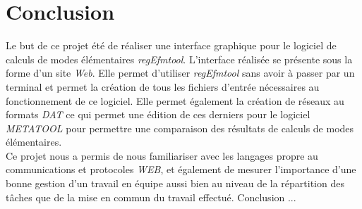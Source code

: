 \documentclass[12pt,a4paper]{report}
\begin{document}


\chapter*{Conclusion}
Le but de ce projet été de réaliser une interface graphique pour le logiciel de calculs de modes élémentaires \emph{regEfmtool}. L'interface réalisée se présente sous la forme d'un site \emph{Web}. Elle permet d'utiliser \emph{regEfmtool} sans avoir à passer par un terminal et permet la création de tous les fichiers d'entrée nécessaires au fonctionnement de ce logiciel.
Elle permet également la création de réseaux au formats \emph{DAT} ce qui permet une édition de ces derniers pour le logiciel \emph{METATOOL} pour permettre une comparaison des résultats de calculs de modes élémentaires.\\

Ce projet nous a permis de nous familiariser avec les langages propre au communications et protocoles \emph{WEB}, et également de mesurer l'importance d'une bonne gestion d'un travail en équipe aussi bien au niveau de la répartition des tâches que de la mise en commun du travail effectué.
Conclusion ...



\end{document}
